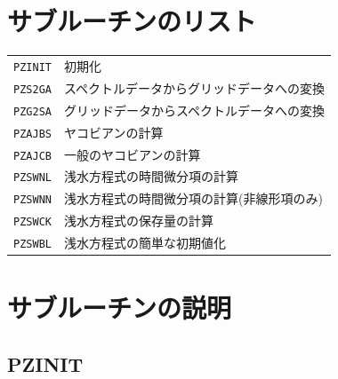 \documentclass[a4j,fleqn]{jarticle}
\begin{document}

\section{サブルーチンのリスト}

\vspace{1em}
\begin{tabular}{ll}
{\tt PZINIT} & 初期化\\
{\tt PZS2GA} & スペクトルデータからグリッドデータへの変換\\
{\tt PZG2SA} & グリッドデータからスペクトルデータへの変換\\
{\tt PZAJBS} & ヤコビアンの計算\\
{\tt PZAJCB} & 一般のヤコビアンの計算\\
{\tt PZSWNL} & 浅水方程式の時間微分項の計算\\
{\tt PZSWNN} & 浅水方程式の時間微分項の計算(非線形項のみ)\\
{\tt PZSWCK} & 浅水方程式の保存量の計算\\
{\tt PZSWBL} & 浅水方程式の簡単な初期値化
\end{tabular}


\section{サブルーチンの説明}

\subsection{PZINIT}
\end{document}
